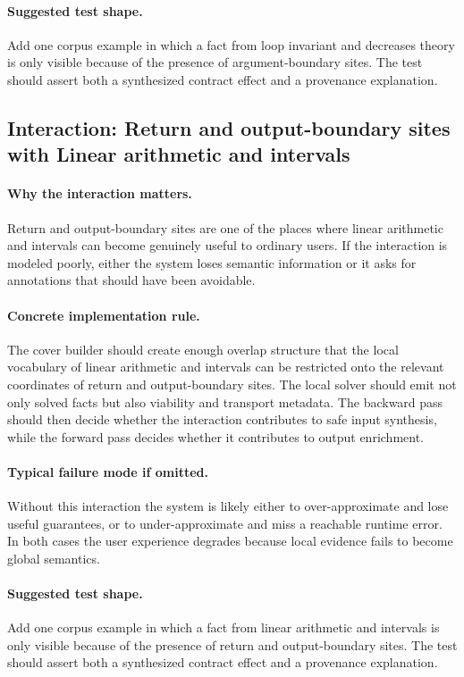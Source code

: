 \documentclass[11pt]{report}
\theoremstyle{definition}
\theoremstyle{plain}
\begin{document}
\paragraph{Suggested test shape.}
Add one corpus example in which a fact from loop invariant and decreases theory is only
visible because of the presence of argument-boundary sites. The test should
assert both a synthesized contract effect and a provenance explanation.

\subsection{Interaction: Return and output-boundary sites with Linear arithmetic and intervals}

\paragraph{Why the interaction matters.}
Return and output-boundary sites are one of the places where linear arithmetic and intervals can become
genuinely useful to ordinary users. If the interaction is modeled poorly,
either the system loses semantic information or it asks for annotations that
should have been avoidable.

\paragraph{Concrete implementation rule.}
The cover builder should create enough overlap structure that the local
vocabulary of linear arithmetic and intervals can be restricted onto the relevant
coordinates of return and output-boundary sites. The local solver should emit not only
solved facts but also viability and transport metadata. The backward pass
should then decide whether the interaction contributes to safe input
synthesis, while the forward pass decides whether it contributes to output
enrichment.

\paragraph{Typical failure mode if omitted.}
Without this interaction the system is likely either to over-approximate and
lose useful guarantees, or to under-approximate and miss a reachable runtime
error. In both cases the user experience degrades because local evidence
fails to become global semantics.

\paragraph{Suggested test shape.}
Add one corpus example in which a fact from linear arithmetic and intervals is only
visible because of the presence of return and output-boundary sites. The test should
assert both a synthesized contract effect and a provenance explanation.
\end{document}
